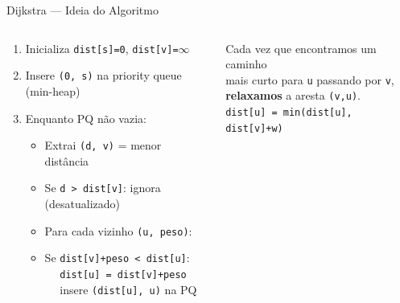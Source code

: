 \documentclass[aspectratio=169,10pt]{beamer}
\begin{document}
\begin{frame}{Dijkstra --- Ideia do Algoritmo}
  \begin{columns}[c]
      \begin{tcolorbox}[caixaRoxa,title={Algoritmo}]
        \footnotesize
        \begin{enumerate}
          \item Inicializa \texttt{dist[s]=0}, \texttt{dist[v]=$\infty$}
          \item Insere \texttt{(0, s)} na priority queue (min-heap)
          \item Enquanto PQ não vazia:
          \begin{itemize}\scriptsize
            \item Extrai \texttt{(d, v)} = menor distância
            \item Se \texttt{d > dist[v]}: ignora (desatualizado)
            \item Para cada vizinho \texttt{(u, peso)}:
            \item Se \texttt{dist[v]+peso < dist[u]}:\\
              $\quad$ \texttt{dist[u] = dist[v]+peso}\\
              $\quad$ insere \texttt{(dist[u], u)} na PQ
          \end{itemize}
        \end{enumerate}
      \end{tcolorbox}
      \vspace{0.08cm}
      \begin{tcolorbox}[caixaAmarelo,title={Relaxamento}]
        \footnotesize
        Cada vez que encontramos um caminho\\
        mais curto para \texttt{u} passando por \texttt{v},\\
        \textbf{relaxamos} a aresta \texttt{(v,u)}.\\[3pt]
        \texttt{dist[u] = min(dist[u], dist[v]+w)}
      \end{tcolorbox}
      \centering
      \begin{tcolorbox}[caixaAzul,title={Simulação passo a passo}]
        \centering\footnotesize
\end{tcolorbox}
\end{columns}
\end{frame}
\end{document}
